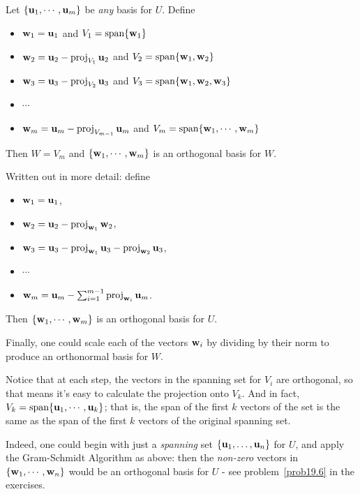 \begin{theorem}\label{theorem:GS}
Let $\{\mathbf{u}_1, \cdots, \mathbf{u}_m  \}$ be {\it any} basis for $U$.  Define
\begin{itemize}
\item $\mathbf{w}_1 = \mathbf{u}_1$  and $V_1 = \textrm{span}\{\mathbf{w}_1\}$
\item $\mathbf{w}_2 = \mathbf{u}_2 - \operatorname{proj}_{V_1}\mathbf{u}_2$ and $V_2 = \textrm{span}\{\mathbf{w}_1,\mathbf{w}_2\}$
\item $\mathbf{w}_3 = \mathbf{u}_3 - \operatorname{proj}_{V_2}\mathbf{u}_3$ and $V_3 = \textrm{span}\{\mathbf{w}_1,\mathbf{w}_2,\mathbf{w}_3\}$
\item $\cdots$
\item $\mathbf{w}_m = \mathbf{u}_m - \operatorname{proj}_{V_{m-1}}\mathbf{u}_m$ and $V_m = \textrm{span}\{\mathbf{w}_1,\cdots,\mathbf{w}_m\}$
\end{itemize}
Then $W = V_m$ and   
$\{\mathbf{w}_1,\cdots,\mathbf{w}_m\}$ is an orthogonal basis for $W$.

\medskip
Written out in more detail: define

\begin{itemize}
\item $\mathbf{w}_1 = \mathbf{u}_1$,
\item $\mathbf{w}_2 = \mathbf{u}_2 - \operatorname{proj}_{\mathbf{w}_1}\mathbf{w}_2$,
\item $\mathbf{w}_3 = \mathbf{u}_3 - \operatorname{proj}_{\mathbf{w}_1}\mathbf{u}_3-\operatorname{proj}_{\mathbf{w}_2}\mathbf{u}_3$,
\item $\cdots$
\item $\mathbf{w}_m = \mathbf{u}_m - \sum_{i=1}^{m-1}\operatorname{proj}_{\mathbf{w}_{i}}\mathbf{u}_m$.
\end{itemize}
Then $\{\mathbf{w}_1,\cdots,\mathbf{w}_m\}$ is an orthogonal basis for $U$.

Finally, one could scale each of the  vectors $\mathbf{w}_i$ by dividing by their norm to produce
an  orthonormal basis for $W$.
\end{theorem}

Notice that at each step, the vectors in the spanning set for $V_i$
are orthogonal, so that means it's easy to calculate the projection onto
$V_k$.  And in fact, $V_k = \textrm{span}\{\mathbf{u}_1 , \cdots, \mathbf{u}_k\}$; that is, the span of the first
$k$ vectors of the set is the same as the span of the first $k$
vectors of the original spanning set.  

\medskip
Indeed, one could begin with just a {\it spanning} set $\{\mathbf{u}_1,\dots, \mathbf{u}_n \}$ for $U$, and apply the Gram-Schmidt Algorithm as above: then the {\it non-zero} vectors in $\{\mathbf{w}_1,\cdots,\mathbf{w}_n\}$ would be an orthogonal basis for $U$ - see problem~\ref{prob19.6} in the exercises.

